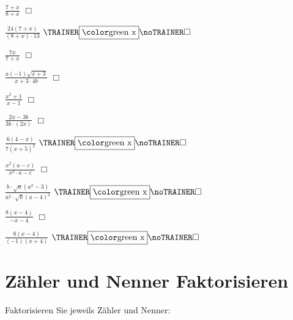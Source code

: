 \begin{bbwAufgabenBlock}
\item $\frac{7+x}{8+x}$ $\Box{}$ 

\item $\frac{24(7+x)}{(8+x)\cdot{}13}$ $\BoxTT$ 

\item $\frac{7x}{7+x}$ $\Box{}$ 

\item $\frac{a(-1)\sqrt{x+3}}{x+3\cdot{}4b}$ $\Box{}$ 

\item $\frac{x^2+1}{x-1}$ $\Box{}$ 

\item $\frac{2x-3b}{3b\cdot{}(2x)}$ $\Box{}$ 

\item $\frac{6(4-x)}{7(x+5)^2}$ $\BoxTT$ 

\item $\frac{x^2(a-c)}{x^2\cdot{}a -c}$ $\Box{}$ 

\item $\frac{b\cdot{}\sqrt{a}(a^2-3)}{a^2\cdot{}\sqrt{b}(a-4)^2}$ $\BoxTT$ 

\item $\frac{8(x-4)}{-x-4}$ $\Box{}$ 

\item $\frac{8(x-4)}{(-1)(x+4)}$ $\BoxTT$ 


\end{bbwAufgabenBlock}
\newpage
\section{Zähler und Nenner Faktorisieren}
Faktorisieren Sie jeweils Zähler und Nenner:

